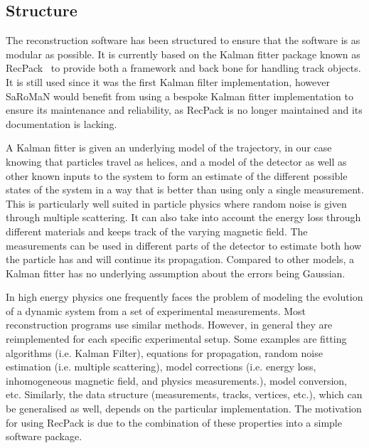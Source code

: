 \subsection{Structure}
The reconstruction software has been structured to ensure that the software is as modular as possible. It is currently based on the Kalman fitter package known as RecPack~\cite{RecPack} to provide both a framework and back bone for handling track objects. It is still used since it was the first Kalman filter implementation, however SaRoMaN would benefit from using a bespoke Kalman fitter implementation to ensure its maintenance and reliability, as RecPack is no longer maintained and its documentation is lacking. 

A Kalman fitter is given an underlying model of the trajectory, in our case knowing that particles travel as helices, and a model of the detector as well as other known inputs to the system to form an estimate of the different possible states of the system in a way that is better than using only a single measurement. This is particularly well suited in particle physics where random noise is given through multiple scattering. It can also take into account the energy loss through different materials and keeps track of the varying magnetic field. The measurements can be used in different parts of the detector to estimate both how the particle has and will continue its propagation. Compared to other models, a Kalman fitter has no underlying assumption about the errors being Gaussian.

In high energy physics one frequently faces the problem of modeling the evolution of a dynamic system from a set of experimental measurements. Most reconstruction programs use similar methods. However, in general they are reimplemented for each specific experimental setup. Some examples are fitting algorithms (i.e. Kalman Filter), equations for propagation, random noise estimation (i.e. multiple scattering), model corrections (i.e. energy loss, inhomogeneous magnetic field, and physics measurements.), model conversion, etc. Similarly, the data structure (measurements, tracks, vertices, etc.), which can be generalised as well, depends on the particular implementation. The motivation for using RecPack is due to the combination of these properties into a simple software package.

